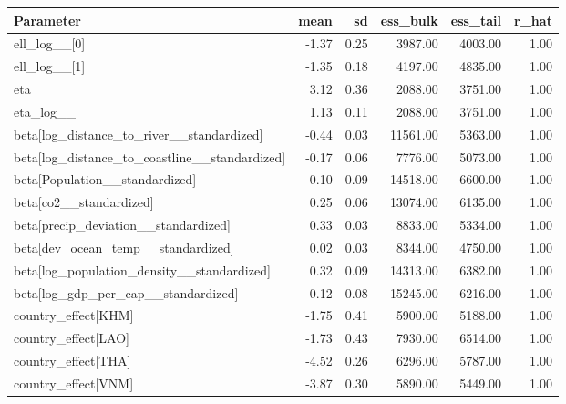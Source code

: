 \begin{table}[htbp]
\centering
{}
\label{tab:full_model_params_sea}
\footnotesize
\begin{tabular}{lrrrrr}
\toprule
\textbf{Parameter} & \textbf{mean} & \textbf{sd} & \textbf{ess\_bulk} & \textbf{ess\_tail} & \textbf{r\_hat} \\
\midrule
ell\_log\_\_[0] & -1.37 & 0.25 & 3987.00 & 4003.00 & 1.00 \\
ell\_log\_\_[1] & -1.35 & 0.18 & 4197.00 & 4835.00 & 1.00 \\
eta & 3.12 & 0.36 & 2088.00 & 3751.00 & 1.00 \\
eta\_log\_\_ & 1.13 & 0.11 & 2088.00 & 3751.00 & 1.00 \\
beta[log\_distance\_to\_river\_\_standardized] & -0.44 & 0.03 & 11561.00 & 5363.00 & 1.00 \\
beta[log\_distance\_to\_coastline\_\_standardized] & -0.17 & 0.06 & 7776.00 & 5073.00 & 1.00 \\
beta[Population\_\_standardized] & 0.10 & 0.09 & 14518.00 & 6600.00 & 1.00 \\
beta[co2\_\_standardized] & 0.25 & 0.06 & 13074.00 & 6135.00 & 1.00 \\
beta[precip\_deviation\_\_standardized] & 0.33 & 0.03 & 8833.00 & 5334.00 & 1.00 \\
beta[dev\_ocean\_temp\_\_standardized] & 0.02 & 0.03 & 8344.00 & 4750.00 & 1.00 \\
beta[log\_population\_density\_\_standardized] & 0.32 & 0.09 & 14313.00 & 6382.00 & 1.00 \\
beta[log\_gdp\_per\_cap\_\_standardized] & 0.12 & 0.08 & 15245.00 & 6216.00 & 1.00 \\
country\_effect[KHM] & -1.75 & 0.41 & 5900.00 & 5188.00 & 1.00 \\
country\_effect[LAO] & -1.73 & 0.43 & 7930.00 & 6514.00 & 1.00 \\
country\_effect[THA] & -4.52 & 0.26 & 6296.00 & 5787.00 & 1.00 \\
country\_effect[VNM] & -3.87 & 0.30 & 5890.00 & 5449.00 & 1.00 \\
\bottomrule
\end{tabular}
\end{table}

